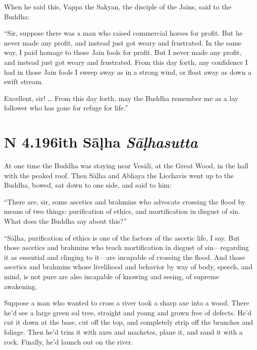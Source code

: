 \documentclass[12pt,openany]{book}%
\newcommand*{\suttatitleacronym}[1]{\smaller[2]{#1}\vspace*{.3em}}
\newcommand*{\suttatitletranslation}[1]{\linebreak{#1}}
\newcommand*{\suttatitleroot}[1]{\linebreak\smaller[2]\itshape{#1}}
\newcommand*{\tocacronym}[1]{\hspace*{-3.3em}{#1}\quad}
\newcommand*{\toctranslation}[1]{#1}
\newcommand*{\tocroot}[1]{(\textit{#1})}
\begin{document}
When he said this, Vappa the Sakyan, the disciple of the Jains, said to the Buddha: 

“Sir, suppose there was a man who raised commercial horses for profit. But he never made any profit, and instead just got weary and frustrated. In the same way, I paid homage to those Jain fools for profit. But I never made any profit, and instead just got weary and frustrated. From this day forth, any confidence I had in those Jain fools I sweep away as in a strong wind, or float away as down a swift stream. 

Excellent, sir! … From this day forth, may the Buddha remember me as a lay follower who has gone for refuge for life.” 

%
\section*{{\suttatitleacronym AN 4.196}{\suttatitletranslation With Sāḷha }{\suttatitleroot Sāḷhasutta}}
\addcontentsline{toc}{section}{\tocacronym{AN 4.196} \toctranslation{With Sāḷha } \tocroot{Sāḷhasutta}}

At one time the Buddha was staying near \textsanskrit{Vesālī}, at the Great Wood, in the hall with the peaked roof. Then \textsanskrit{Sāḷha} and Abhaya the Licchavis went up to the Buddha, bowed, sat down to one side, and said to him: 

“There are, sir, some ascetics and brahmins who advocate crossing the flood by means of two things: purification of ethics, and mortification in disgust of sin. What does the Buddha say about this?” 

“\textsanskrit{Sāḷha}, purification of ethics is one of the factors of the ascetic life, I say. But those ascetics and brahmins who teach mortification in disgust of sin—regarding it as essential and clinging to it—are incapable of crossing the flood. And those ascetics and brahmins whose livelihood and behavior by way of body, speech, and mind, is not pure are also incapable of knowing and seeing, of supreme awakening. 

Suppose a man who wanted to cross a river took a sharp axe into a wood. There he’d see a large green sal tree, straight and young and grown free of defects. He’d cut it down at the base, cut off the top, and completely strip off the branches and foliage. Then he’d trim it with axes and machetes, plane it, and sand it with a rock. Finally, he’d launch out on the river. 
\end{document}
